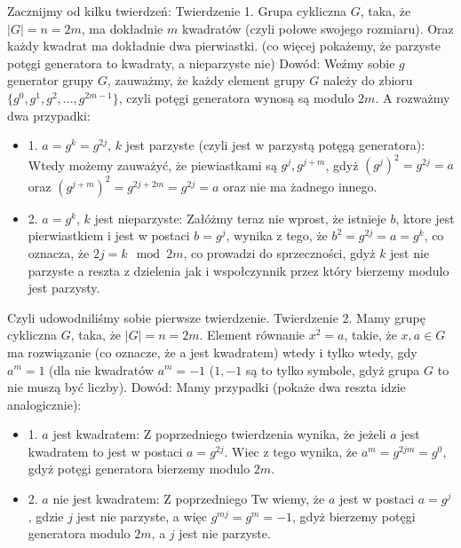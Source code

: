 Zacznijmy od kilku twierdzeń:\newline \newline
Twierdzenie 1.\newline
Grupa cykliczna $G$, taka, że $|G| = n = 2m$, ma dokładnie $m$ kwadratów (czyli połowe swojego rozmiaru). Oraz każdy kwadrat ma dokładnie dwa pierwiastki. (co więcej pokażemy, że parzyste potęgi generatora to kwadraty, a nieparzyste nie)
\newline \newline
Dowód:\newline
Weźmy sobie $g$ generator grupy $G$, zauważmy, że każdy element grupy $G$ należy do zbioru $\{g^0,g^1,g^2,...,g^{2m-1}\}$, czyli potęgi generatora wynosą są modulo $2m$. A rozważmy dwa przypadki:
\begin{itemize}
    \item 1. $a = g^k = g^{2j}$, $k$ jest parzyste (czyli jest w parzystą potęgą generatora):
    \newline
    Wtedy możemy zauważyć, że piewiastkami są $g^j,g^{j+m}$, gdyż $(g^{j})^2 = g^{2j} = a$ oraz $(g^{j+m})^2 = g^{2j+2m} = g^{2j} = a$ oraz nie ma żadnego innego.
    \item 2. $a = g^k$, $k$ jest nieparzyste:
    \newline
    Załóżmy teraz nie wprost, że istnieje $b$, ktore jest pierwiastkiem i jest w postaci $b = g^j$, wynika z tego, że $b^2 = g^{2j} = a = g^{k}$, co oznacza, że $2j = k \mod 2m$, co prowadzi do sprzeczności, gdyż $k$ jest nie parzyste a reszta z dzielenia jak i wspołczynnik przez który bierzemy modulo jest parzysty.
\end{itemize}
Czyli udowodniliśmy sobie pierwsze twierdzenie.
\newline \newline
Twierdzenie 2.\newline
Mamy grupę cykliczna $G$, taka, że $|G| = n = 2m$. Element równanie $x^2 = a$, takie, że $x,a \in G$ ma rozwiązanie (co oznacze, że a jest kwadratem) wtedy i tylko wtedy, gdy $a^m = 1$ (dla nie kwadratów $a^m = -1$ ($1,-1$ są to tylko symbole, gdyż grupa $G$ to nie muszą być liczby).
\newline \newline
Dowód:\newline
Mamy przypadki (pokaże dwa reszta idzie analogicznie):
\begin{itemize}
    \item 1. $a$ jest kwadratem:\newline
    Z poprzedniego twierdzenia wynika, że jeżeli $a$ jest kwadratem to jest w postaci $a = g^{2j}$. Wiec z tego wynika, że $a^m = g^{2jm} = g^0$, gdyż potęgi generatora bierzemy modulo $2m$.
    \item 2. $a$ nie jest kwadratem:\newline
    Z poprzedniego Tw wiemy, że $a$ jest w postaci $a = g^j$, gdzie $j$ jest nie parzyste, a więc $g^{mj} = g^m = -1$, gdyż bierzemy potęgi generatora modulo $2m$, a $j$ jest nie parzyste.
\end{itemize}
